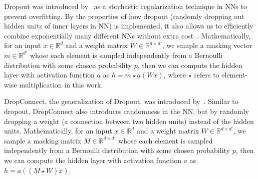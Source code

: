     Dropout was introduced by~\cite{DropoutOG} as a stochastic regularization technique in NNs to prevent overfitting. By the properties of how dropout (randomly dropping out hidden units of inner layers in NN) is implemented, it also allows us to efficiently combine exponentially many different NNs without extra cost~\cite{DropoutOG}. Mathematically, for an input $x \in \mathbb{R}^d$ and a weight matrix $W\in \mathbb{R}^{d \times d'}$, we sample a masking vector $m \in \mathbb{R}^{d'}$ whose each element is sampled independently from a Bernoulli distribution with some chosen probability $p$, then we can compute the hidden layer with activation function $a$ as $h = m \star a(Wx)$, where $\star$ refers to element-wise multiplication in this work.
    
    DropConnect, the generalization of Dropout, was introduced by~\cite{DropConnectOG}. Similar to dropout, DropConnect also introduces randomness in the NN, but by randomly dropping a weight (a connection between two hidden units) instead of the hidden units. Mathematically, for an input $x \in \mathbb{R}^d$ and a weight matrix $W\in \mathbb{R}^{d \times d'}$, we sample a masking matrix $M \in \mathbb{R}^{d \times d'}$ whose each element is sampled independently from a Bernoulli distribution with some chosen probability $p$, then we can compute the hidden layer with activation function $a$ as $h = a((M \star W) x)$.
    
